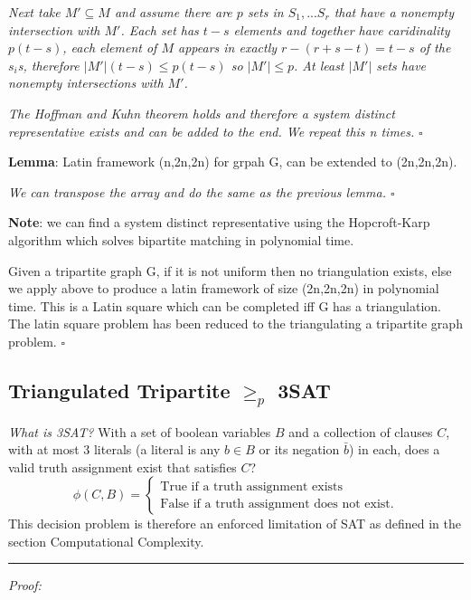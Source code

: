 \documentclass[a4paper,11pt]{report}
\newcounter{col}
\begin{document}
\textit{Next take $M'\subseteq M$ and assume there are $p$ sets in $S_1,...S_r$ that have a nonempty intersection with $M'$. Each set has $t-s$ elements and together have caridinality $p(t-s)$, each element of $M$ appears in exactly $r-(r+s-t)=t-s$ of the $s_i$s, therefore $|M'|(t-s)\leq p(t-s)$ so $|M'|\leq p$. At least $|M'|$ sets have nonempty intersections with $M'$.}

\textit{The Hoffman and Kuhn theorem holds and therefore a system distinct representative exists and can be added to the end. We repeat this n times.} $\square$

\textbf{Lemma}: Latin framework (n,2n,2n) for grpah G, can be extended to (2n,2n,2n).

\textit{We can transpose the array and do the same as the previous lemma. $\square$}

\textbf{Note}: we can find a system distinct representative using the Hopcroft-Karp \cite{hopcroft} algorithm which solves bipartite matching in polynomial time. 

Given a tripartite graph G, if it is not uniform then no triangulation exists, else we apply above to produce a latin framework of size (2n,2n,2n) in polynomial time. This is a Latin square which can be completed iff G has a triangulation. The latin square problem has been reduced to the triangulating a tripartite graph problem. $\square$

\subsection{Triangulated Tripartite $\geq_p$ 3SAT}

\textit{What is 3SAT?} With a set of boolean variables $B$ and a collection of clauses $C$, with at most 3 literals (a literal is any $b \in B$ or its negation $\bar{b}$) in each, does a valid truth assignment exist that satisfies $C$?
		\begin{equation}
		        \phi (C,B) = \begin{cases}
		            \text{True if a truth assignment exists} \\
		            \text{False if a truth assignment does not exist}.
				\end{cases}
		\end{equation}
This decision problem is therefore an enforced limitation of SAT as defined in the section Computational Complexity.

\noindent\rule{4cm}{0.4pt}

\textit{Proof:}
\end{document}
